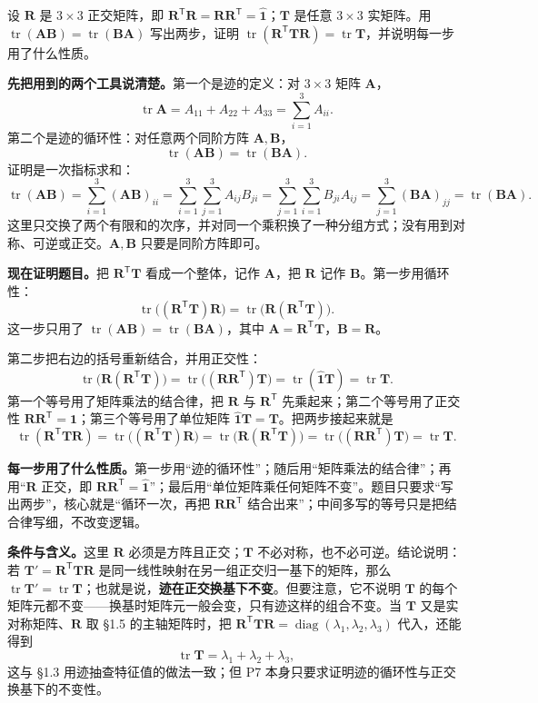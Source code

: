 \documentclass[11pt]{ctexart}
\newcommand{\ten}[1]{\mathbf{#1}}
\newcommand{\unitd}{\hat{\ten{1}}}
\newcommand{\tr}{\operatorname{tr}}
\let\orighdr\hdr
\renewcommand{\hdr}[2]{\par\needspace{10\baselineskip}\orighdr{#1}{#2}}
\begin{document}
\clearpage
\appendix
{}

{设 $\ten R$ 是 $3\times3$ 正交矩阵，即 $\ten R^{\mathsf T}\ten R=\ten R\ten R^{\mathsf T}=\unitd$；$\ten T$ 是任意 $3\times3$ 实矩阵。用 $\tr(\ten A\ten B)=\tr(\ten B\ten A)$ 写出两步，证明 $\tr(\ten R^{\mathsf T}\ten T\ten R)=\tr\ten T$，并说明每一步用了什么性质。}

\textbf{先把用到的两个工具说清楚。}第一个是迹的定义：对 $3\times3$ 矩阵 $\ten A$，
\[
\tr\ten A=A_{11}+A_{22}+A_{33}=\sum_{i=1}^{3}A_{ii}.
\]
第二个是迹的循环性：对任意两个同阶方阵 $\ten A,\ten B$，
\[
\tr(\ten A\ten B)=\tr(\ten B\ten A).
\]
证明是一次指标求和：
\[
\tr(\ten A\ten B)
=\sum_{i=1}^{3}(\ten A\ten B)_{ii}
=\sum_{i=1}^{3}\sum_{j=1}^{3}A_{ij}B_{ji}
=\sum_{j=1}^{3}\sum_{i=1}^{3}B_{ji}A_{ij}
=\sum_{j=1}^{3}(\ten B\ten A)_{jj}
=\tr(\ten B\ten A).
\]
这里只交换了两个有限和的次序，并对同一个乘积换了一种分组方式；没有用到对称、可逆或正交。$\ten A,\ten B$ 只要是同阶方阵即可。

\textbf{现在证明题目。}把 $\ten R^{\mathsf T}\ten T$ 看成一个整体，记作 $\ten A$，把 $\ten R$ 记作 $\ten B$。第一步用循环性：
\[
\tr\bigl((\ten R^{\mathsf T}\ten T)\ten R\bigr)
=\tr\bigl(\ten R(\ten R^{\mathsf T}\ten T)\bigr).
\]
这一步只用了 $\tr(\ten A\ten B)=\tr(\ten B\ten A)$，其中 $\ten A=\ten R^{\mathsf T}\ten T$，$\ten B=\ten R$。

第二步把右边的括号重新结合，并用正交性：
\[
\tr\bigl(\ten R(\ten R^{\mathsf T}\ten T)\bigr)
=\tr\bigl((\ten R\ten R^{\mathsf T})\ten T\bigr)
=\tr(\unitd\ten T)
=\tr\ten T .
\]
第一个等号用了矩阵乘法的结合律，把 $\ten R$ 与 $\ten R^{\mathsf T}$ 先乘起来；第二个等号用了正交性 $\ten R\ten R^{\mathsf T}=\unitd$；第三个等号用了单位矩阵 $\unitd\ten T=\ten T$。把两步接起来就是
\[
\tr(\ten R^{\mathsf T}\ten T\ten R)
=\tr\bigl((\ten R^{\mathsf T}\ten T)\ten R\bigr)
=\tr\bigl(\ten R(\ten R^{\mathsf T}\ten T)\bigr)
=\tr\bigl((\ten R\ten R^{\mathsf T})\ten T\bigr)
=\tr\ten T .
\]

\textbf{每一步用了什么性质。}第一步用“迹的循环性”；随后用“矩阵乘法的结合律”；再用“$\ten R$ 正交，即 $\ten R\ten R^{\mathsf T}=\unitd$”；最后用“单位矩阵乘任何矩阵不变”。题目只要求“写出两步”，核心就是“循环一次，再把 $\ten R\ten R^{\mathsf T}$ 结合出来”；中间多写的等号只是把结合律写细，不改变逻辑。

\textbf{条件与含义。}这里 $\ten R$ 必须是方阵且正交；$\ten T$ 不必对称，也不必可逆。结论说明：若 $\ten T'=\ten R^{\mathsf T}\ten T\ten R$ 是同一线性映射在另一组正交归一基下的矩阵，那么 $\tr\ten T'=\tr\ten T$；也就是说，\textbf{迹在正交换基下不变}。但要注意，它不说明 $\ten T$ 的每个矩阵元都不变——换基时矩阵元一般会变，只有迹这样的组合不变。当 $\ten T$ 又是实对称矩阵、$\ten R$ 取 §1.5 的主轴矩阵时，把 $\ten R^{\mathsf T}\ten T\ten R=\operatorname{diag}(\lambda_1,\lambda_2,\lambda_3)$ 代入，还能得到
\[
\tr\ten T=\lambda_1+\lambda_2+\lambda_3,
\]
这与 §1.3 用迹抽查特征值的做法一致；但 P7 本身只要求证明迹的循环性与正交换基下的不变性。
\end{document}
